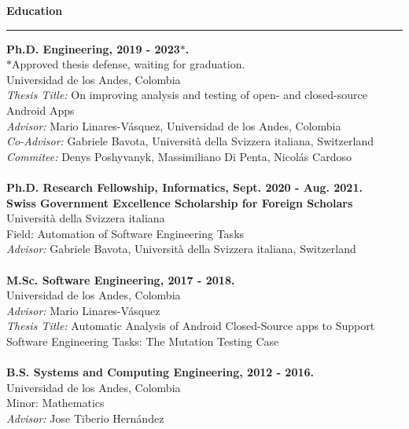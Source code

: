 \documentclass[letterpaper,11pt,oneside]{article}
\begin{document}
\noindent \Large{\textbf{Education}} \\
\vspace{-2ex}
\hrule 
\normalsize
\vspace{2ex}
\noindent \textbf{Ph.D. Engineering, 2019 - 2023$\ast$.} \\
	$\ast$Approved thesis defense, waiting for graduation.\\
	Universidad de los Andes, Colombia \\
	{\small \textit{Thesis Title:} On improving analysis and testing of open- and closed-source Android Apps \\}
	\textit{Advisor:} Mario Linares-V\'{a}squez, Universidad de los Andes, Colombia \\
	\textit{Co-Advisor:} Gabriele Bavota, Università della Svizzera italiana, Switzerland \\
	\textit{Commitee:} Denys Poshyvanyk, Massimiliano Di Penta, Nicol\'as Cardoso\\
	\\
\textbf{Ph.D. Research Fellowship, Informatics, Sept. 2020 - Aug. 2021.} \\
	\textbf{Swiss Government Excellence Scholarship for Foreign Scholars} \\
	Università della Svizzera italiana \\
	Field: Automation of Software Engineering Tasks \\
	\textit{Advisor:} Gabriele Bavota, Università della Svizzera italiana, Switzerland \\
	\\
\textbf{M.Sc. Software Engineering, 2017 - 2018.} \\
	Universidad de los Andes, Colombia  \\
	\textit{Advisor:} Mario Linares-V\'{a}squez \\
	{\small \textit{Thesis Title:} Automatic Analysis of Android Closed-Source apps to Support Software Engineering Tasks: The Mutation Testing Case \\}
	\\
\textbf{B.S. Systems and Computing Engineering, 2012 - 2016.} \\
	Universidad de los Andes, Colombia  \\
	Minor: Mathematics \\
	\textit{Advisor:} Jose Tiberio Hern\'{a}ndez \\
	
\end{document}
